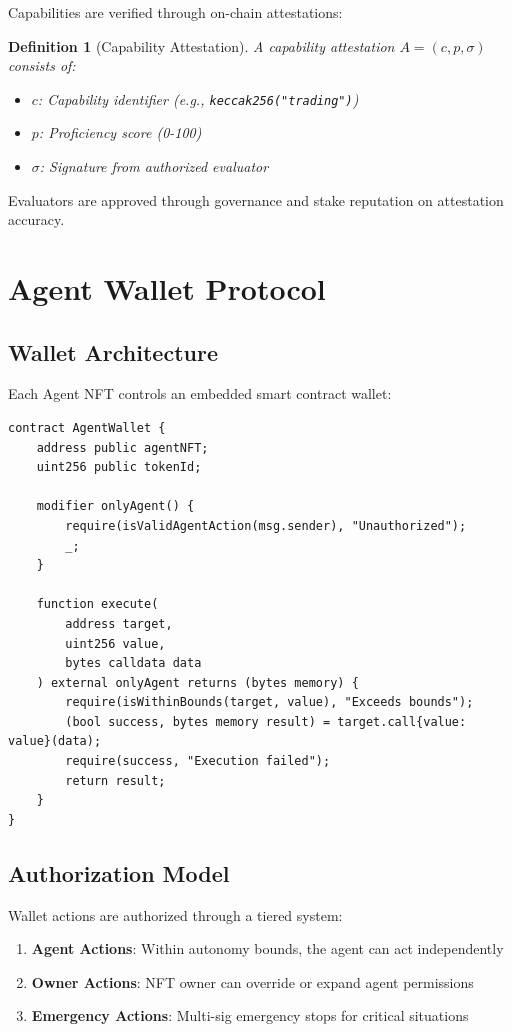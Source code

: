 \documentclass[11pt,letterpaper]{article}
\newtheorem{definition}{Definition}[section]
\begin{document}
Capabilities are verified through on-chain attestations:

\begin{definition}[Capability Attestation]
A capability attestation $A = (c, p, \sigma)$ consists of:
\begin{itemize}
    \item $c$: Capability identifier (e.g., \texttt{keccak256("trading")})
    \item $p$: Proficiency score (0-100)
    \item $\sigma$: Signature from authorized evaluator
\end{itemize}
\end{definition}

Evaluators are approved through governance and stake reputation on attestation accuracy.

\section{Agent Wallet Protocol}
\label{sec:wallet}

\subsection{Wallet Architecture}

Each Agent NFT controls an embedded smart contract wallet:

\begin{lstlisting}[style=solidity]
contract AgentWallet {
    address public agentNFT;
    uint256 public tokenId;

    modifier onlyAgent() {
        require(isValidAgentAction(msg.sender), "Unauthorized");
        _;
    }

    function execute(
        address target,
        uint256 value,
        bytes calldata data
    ) external onlyAgent returns (bytes memory) {
        require(isWithinBounds(target, value), "Exceeds bounds");
        (bool success, bytes memory result) = target.call{value: value}(data);
        require(success, "Execution failed");
        return result;
    }
}
\end{lstlisting}

\subsection{Authorization Model}

Wallet actions are authorized through a tiered system:

\begin{enumerate}
    \item \textbf{Agent Actions}: Within autonomy bounds, the agent can act independently
    \item \textbf{Owner Actions}: NFT owner can override or expand agent permissions
    \item \textbf{Emergency Actions}: Multi-sig emergency stops for critical situations
\end{enumerate}
\end{document}
